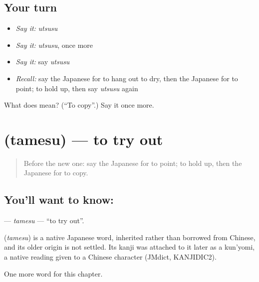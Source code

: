 \subsection*{Your turn}
\begin{itemize}
\raggedright
  \item \emph{Say it:} \emph{utsusu}
  \item \emph{Say it:} \emph{utsusu}, once more
  \item \emph{Say it:} say \emph{utsusu}
  \item \emph{Recall:} say the Japanese for to hang out to dry, then the Japanese for to point; to hold up, then say \emph{utsusu} again
\end{itemize}

\begin{tcolorbox}[breakable,colback=teal!4,colframe=teal!35!black,title={Before you move on}]
What does  mean? (\textquotedblleft{}To copy\textquotedblright{}.) Say it once more.
\end{tcolorbox}
\section[\texorpdfstring{\ja{ためす} (tamesu)}{ためす (tamesu)}]{ (tamesu) — to try out}

\label{lesson:JA-C88-tamesu}



\begin{quote}
Before the new one: say the Japanese for to point; to hold up, then the Japanese for to copy.
\end{quote}

\subsection*{You'll want to know: }
\textbf{} — \emph{tamesu} — \textquotedblleft{}to try out\textquotedblright{}.

\begin{cousinweb}
\textbf{} (\emph{tamesu}) is a native Japanese word, inherited rather than borrowed from Chinese, and its older origin is not settled. Its kanji was attached to it later as a kun'yomi, a native reading given to a Chinese character (JMdict, KANJIDIC2).
\end{cousinweb}

\begin{grammarlens}[title={What you've built}]
One more word for this chapter.
\end{grammarlens}

